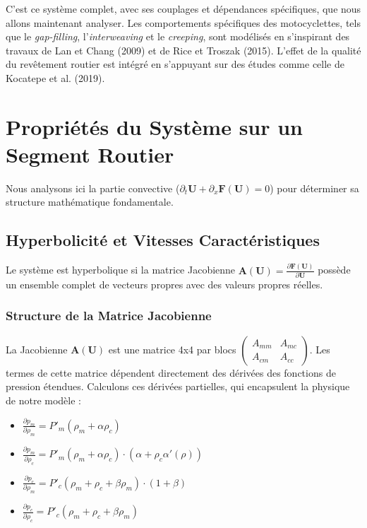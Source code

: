 C'est ce système complet, avec ses couplages et dépendances spécifiques, que nous allons maintenant analyser. Les comportements spécifiques des motocyclettes, tels que le \textit{gap-filling}, l'\textit{interweaving} et le \textit{creeping}, sont modélisés en s'inspirant des travaux de Lan et Chang (2009) et de Rice et Troszak (2015). L'effet de la qualité du revêtement routier est intégré en s'appuyant sur des études comme celle de Kocatepe et al. (2019).

\section{Propriétés du Système sur un Segment Routier}
Nous analysons ici la partie convective ($\partial_t \mathbf{U} + \partial_x \mathbf{F}(\mathbf{U}) = 0$) pour déterminer sa structure mathématique fondamentale.

\subsection{Hyperbolicité et Vitesses Caractéristiques}
Le système est hyperbolique si la matrice Jacobienne $\mathbf{A}(\mathbf{U}) = \frac{\partial \mathbf{F}(\mathbf{U})}{\partial \mathbf{U}}$ possède un ensemble complet de vecteurs propres avec des valeurs propres réelles.

\subsubsection{Structure de la Matrice Jacobienne}
La Jacobienne $\mathbf{A}(\mathbf{U})$ est une matrice 4x4 par blocs $\begin{pmatrix} A_{mm} & A_{mc} \\ A_{cm} & A_{cc} \end{pmatrix}$. Les termes de cette matrice dépendent directement des dérivées des fonctions de pression étendues. Calculons ces dérivées partielles, qui encapsulent la physique de notre modèle :
\begin{itemize}
    \item $\frac{\partial p_m}{\partial \rho_m} = P'_m(\rho_m + \alpha\rho_c)$
    \item $\frac{\partial p_m}{\partial \rho_c} = P'_m(\rho_m + \alpha\rho_c) \cdot (\alpha + \rho_c \alpha'(\rho))$
    \item $\frac{\partial p_c}{\partial \rho_m} = P'_c(\rho_m + \rho_c + \beta\rho_m) \cdot (1+\beta)$
    \item $\frac{\partial p_c}{\partial \rho_c} = P'_c(\rho_m + \rho_c + \beta\rho_m)$
\end{itemize}

